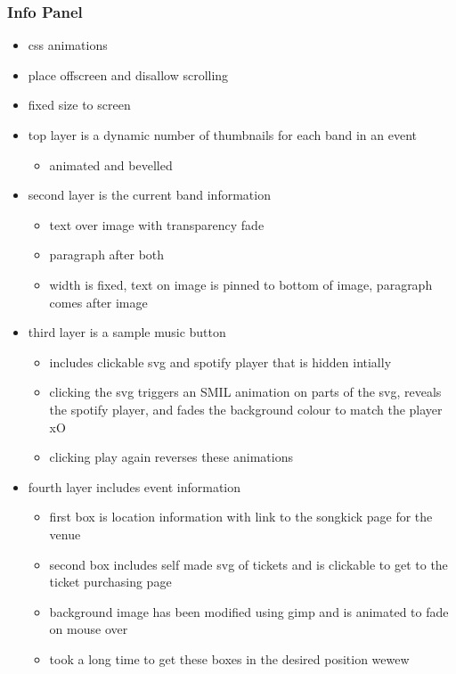 \documentclass[10pt]{article}
\begin{document}
            \subsubsection{Info Panel}
                \begin{itemize}
                    \item css animations
                    \item place offscreen and disallow scrolling
                    \item fixed size to screen

                    \item top layer is a dynamic number of thumbnails for each band in an event
                        \begin{itemize}
                            \item animated and bevelled
                        \end{itemize}
                    \item second layer is the current band information
                        \begin{itemize}
                            \item text over image with transparency fade
                            \item paragraph after both
                            \item width is fixed, text on image is pinned to bottom of image, paragraph comes after image
                        \end{itemize}
                    \item third layer is a sample music button
                        \begin{itemize}
                            \item includes clickable svg and spotify player that is hidden intially
                            \item clicking the svg triggers an SMIL animation on parts of the svg, reveals the spotify player, and fades the background colour to match the player xO
                            \item clicking play again reverses these animations
                        \end{itemize}

                    \item fourth layer includes event information
                        \begin{itemize}
                            \item first box is location information with link to the songkick page for the venue
                            \item second box includes self made svg of tickets and is clickable to get to the ticket purchasing page
                            \item background image has been modified using gimp and is animated to fade on mouse over
                            \item took a long time to get these boxes in the desired position wewew
                        \end{itemize}
                \end{itemize}
\end{document}

